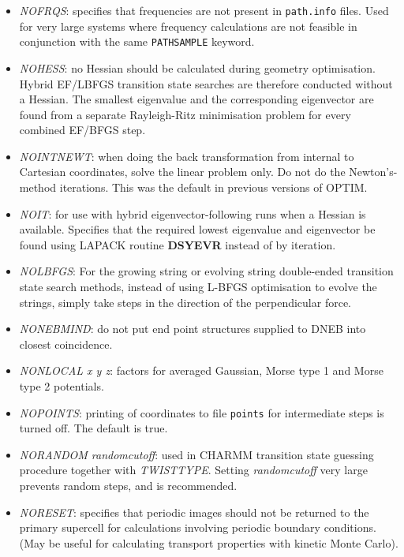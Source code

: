 \documentclass[12pt,a4paper,dvips]{article}
\begin{document}
\begin{itemize}
\item {\it NOFRQS\/}: specifies that frequencies are not present in {\tt path.info} files.
Used for very large systems where frequency calculations are not feasible in conjunction
with the same {\tt PATHSAMPLE} keyword.

\item {\it NOHESS\/}: no Hessian should be calculated during geometry optimisation.
Hybrid EF/LBFGS transition state searches are therefore conducted without a
Hessian. The smallest eigenvalue and the corresponding eigenvector are found from a separate
Rayleigh-Ritz minimisation problem for every combined EF/BFGS step.

\item {\it NOINTNEWT\/}: when doing the back transformation from internal to
  Cartesian coordinates, solve the linear problem only. Do not do the
  Newton's-method iterations. This was the default in previous versions of
  OPTIM.

\item {\it NOIT\/}: for use with hybrid eigenvector-following runs when a Hessian is available.
                    Specifies that the required lowest eigenvalue and eigenvector be found using
                    LAPACK routine {\bf DSYEVR} instead of by iteration.

\item {\it NOLBFGS\/}: For the growing string or evolving string double-ended
  transition state search methods, instead of using L-BFGS optimisation to
  evolve the strings, simply take steps in the direction of the perpendicular force.

\item {\it NONEBMIND\/}: do not put end point structures supplied to DNEB into 
closest coincidence.

\item {\it NONLOCAL x y z\/}: factors for averaged Gaussian, Morse type 1 and Morse
type 2 potentials.

\item {\it NOPOINTS\/}: printing of coordinates to file {\tt points} for intermediate steps
is turned off. The default is true.

\item {\it NORANDOM randomcutoff\/}: used in CHARMM transition state guessing procedure
together with {\it TWISTTYPE\/}. Setting {\it randomcutoff\/} very large prevents random
steps, and is recommended.

\item {\it NORESET\/}: specifies that periodic images should not be returned to the
primary supercell for calculations involving periodic boundary conditions. (May be
useful for calculating transport properties with kinetic Monte Carlo).


\end{itemize}
\end{document}
